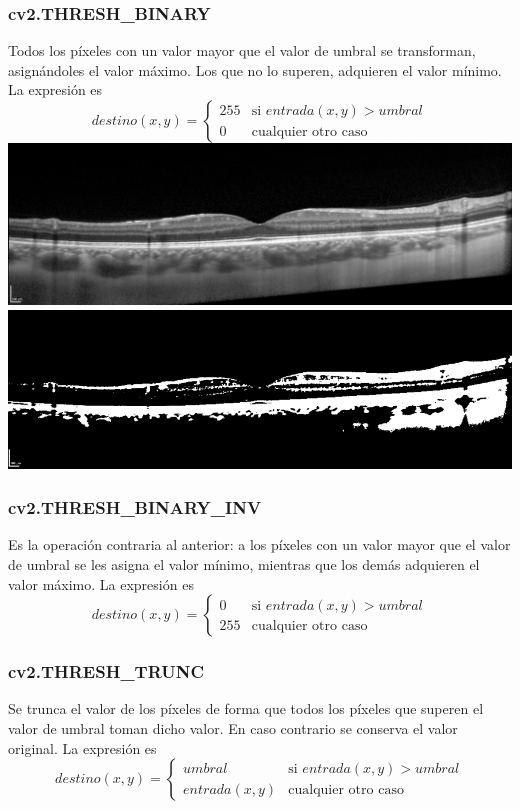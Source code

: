 \subsubsection{cv2.THRESH\_BINARY}
Todos los píxeles con un valor mayor que el valor de umbral se transforman,
asignándoles el valor máximo. Los que no lo superen, adquieren el valor mínimo. 
La expresión es
\begin{equation*}
  destino(x, y) =
  \begin{cases}
    255 & \text{si } entrada(x, y) > umbral \\
    0 & \text{cualquier otro caso}
  \end{cases}
\end{equation*}
\includegraphics[scale=0.22]{imagenes/EjemploOriginal.png}
\includegraphics[scale=0.22]{imagenes/EjemploThreshBin.png}

\subsubsection{cv2.THRESH\_BINARY\_INV}
Es la operación contraria al anterior: a los píxeles con un valor mayor que 
el valor de umbral se les asigna el valor mínimo, mientras que los demás 
adquieren el valor máximo. La expresión es
\begin{equation*}
  destino(x, y) =
  \begin{cases}
    0 & \text{si } entrada(x, y) > umbral \\
    255 & \text{cualquier otro caso}
  \end{cases}
\end{equation*}
\subsubsection{cv2.THRESH\_TRUNC}
Se trunca el valor de los píxeles de forma que todos los píxeles que superen 
el valor de umbral toman dicho valor. En caso contrario se conserva el valor 
original. La expresión es
\begin{equation*}
  destino(x, y) =
  \begin{cases}
    umbral & \text{si } entrada(x, y) > umbral \\
    entrada(x, y) & \text{cualquier otro caso}
  \end{cases}
\end{equation*}
